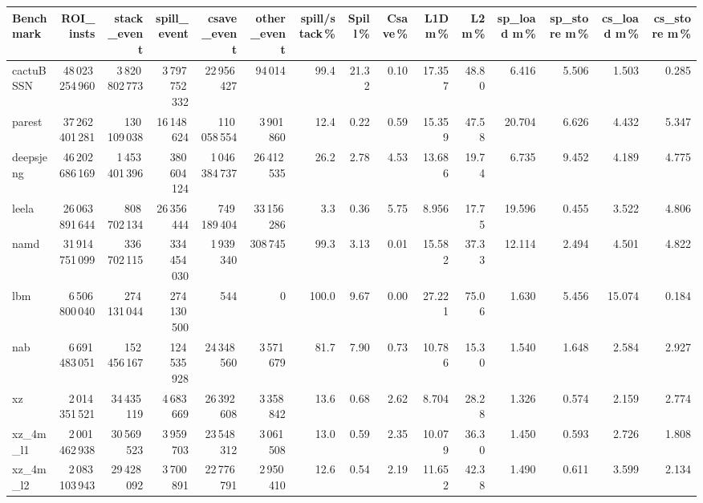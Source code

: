 \documentclass[9pt,landscape,a4paper]{article}
\begin{document}
\vspace{2mm}
\centering
\begin{adjustbox}{max width=\textwidth, max totalheight=0.50\textheight}%
\begin{tabular}{lrrrrrrrrrrrrrr}
\toprule
Benchmark & ROI\_insts & stack\_event & \textbf{spill\_event} & csave\_event & other\_event & spill/stack\,\% & Spill\,\% & Csave\,\% & L1D m\,\% & L2 m\,\% & sp\_load m\,\% & sp\_store m\,\% & cs\_load m\,\% & cs\_store m\,\% \\
\midrule
cactuBSSN & 48\,023\,254\,960 & 3\,820\,802\,773 & 3\,797\,752\,332 & 22\,956\,427 & 94\,014 & 99.4 & 21.32 & 0.10 & 17.357 & 48.80 & 6.416 & 5.506 & 1.503 & 0.285 \\
parest & 37\,262\,401\,281 & 130\,109\,038 & 16\,148\,624 & 110\,058\,554 & 3\,901\,860 & 12.4 & 0.22 & 0.59 & 15.359 & 47.58 & 20.704 & 6.626 & 4.432 & 5.347 \\
deepsjeng & 46\,202\,686\,169 & 1\,453\,401\,396 & 380\,604\,124 & 1\,046\,384\,737 & 26\,412\,535 & 26.2 & 2.78 & 4.53 & 13.686 & 19.74 & 6.735 & 9.452 & 4.189 & 4.775 \\
leela & 26\,063\,891\,644 & 808\,702\,134 & 26\,356\,444 & 749\,189\,404 & 33\,156\,286 & 3.3 & 0.36 & 5.75 & 8.956 & 17.75 & 19.596 & 0.455 & 3.522 & 4.806 \\
namd & 31\,914\,751\,099 & 336\,702\,115 & 334\,454\,030 & 1\,939\,340 & 308\,745 & 99.3 & 3.13 & 0.01 & 15.582 & 37.33 & 12.114 & 2.494 & 4.501 & 4.822 \\
lbm & 6\,506\,800\,040 & 274\,131\,044 & 274\,130\,500 & 544 & 0 & 100.0 & 9.67 & 0.00 & 27.221 & 75.06 & 1.630 & 5.456 & 15.074 & 0.184 \\
nab & 6\,691\,483\,051 & 152\,456\,167 & 124\,535\,928 & 24\,348\,560 & 3\,571\,679 & 81.7 & 7.90 & 0.73 & 10.786 & 15.30 & 1.540 & 1.648 & 2.584 & 2.927 \\
xz & 2\,014\,351\,521 & 34\,435\,119 & 4\,683\,669 & 26\,392\,608 & 3\,358\,842 & 13.6 & 0.68 & 2.62 & 8.704 & 28.28 & 1.326 & 0.574 & 2.159 & 2.774 \\
xz\_4m\_l1 & 2\,001\,462\,938 & 30\,569\,523 & 3\,959\,703 & 23\,548\,312 & 3\,061\,508 & 13.0 & 0.59 & 2.35 & 10.079 & 36.30 & 1.450 & 0.593 & 2.726 & 1.808 \\
xz\_4m\_l2 & 2\,083\,103\,943 & 29\,428\,092 & 3\,700\,891 & 22\,776\,791 & 2\,950\,410 & 12.6 & 0.54 & 2.19 & 11.652 & 42.38 & 1.490 & 0.611 & 3.599 & 2.134 \\

\end{tabular}
\end{adjustbox}
\end{document}

